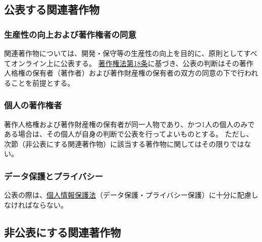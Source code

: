 \subsection{公表する関連著作物}

\subsubsection{生産性の向上および著作権者の同意}
関連著作物については、開発・保守等の生産性の向上を目的に、原則としてすべてオンライン上に公表する。
\href{https://elaws.e-gov.go.jp/document?lawid=345AC0000000048\#Mp-At_2}{著作権法第18条}に基づき、公表の判断はその著作人格権の保有者（著作者）および著作財産権の保有者の双方の同意の下で行われることを前提とする。

\subsubsection{個人の著作権者}
著作人格権および著作財産権の保有者が同一人物であり、かつ1人の個人のみである場合は、その個人が自身の判断で公表を行ってよいものとする。
ただし、次節（非公表にする関連著作物）に該当する著作物に関してはその限りではない。

\subsubsection{データ保護とプライバシー}
公表の際は、\href{https://elaws.e-gov.go.jp/document?lawid=415AC0000000057}{個人情報保護法}（データ保護・プライバシー保護）に十分に配慮しなければならない。


\subsection{非公表にする関連著作物}

